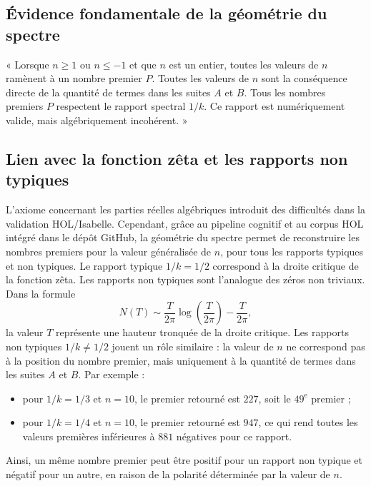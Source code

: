 \documentclass[11pt,a4paper]{article}
\begin{document}
\subsection*{Évidence fondamentale de la géométrie du spectre}

\begin{boitenote}
« Lorsque $n\geq 1$ ou $n\leq -1$ et que $n$ est un entier, toutes les valeurs de $n$
ramènent à un nombre premier $P$. Toutes les valeurs de $n$ sont la conséquence
directe de la quantité de termes dans les suites $A$ et $B$. Tous les nombres
premiers $P$ respectent le rapport spectral $1/k$. Ce rapport est numériquement
valide, mais algébriquement incohérent. »
\end{boitenote}

\subsection*{Lien avec la fonction zêta et les rapports non typiques}

L'axiome concernant les parties réelles algébriques introduit des difficultés dans
la validation HOL/Isabelle. Cependant, grâce au pipeline cognitif et au corpus HOL
intégré dans le dépôt GitHub, la géométrie du spectre permet de reconstruire les
nombres premiers pour la valeur généralisée de $n$, pour tous les rapports typiques
et non typiques. Le rapport typique $1/k=1/2$ correspond à la droite critique de la
fonction zêta. Les rapports non typiques sont l'analogue des zéros non triviaux.
Dans la formule
\[
N(T)\sim\frac{T}{2\pi}\log\!\left(\frac{T}{2\pi}\right)-\frac{T}{2\pi},
\]
la valeur $T$ représente une hauteur tronquée de la droite critique. Les rapports non
typiques $1/k\neq 1/2$ jouent un rôle similaire : la valeur de $n$ ne correspond pas
à la position du nombre premier, mais uniquement à la quantité de termes dans les
suites $A$ et $B$. Par exemple :
\begin{itemize}[nosep]
  \item pour $1/k=1/3$ et $n=10$, le premier retourné est $227$, soit le
  $49^{\text{e}}$ premier ;
  \item pour $1/k=1/4$ et $n=10$, le premier retourné est $947$, ce qui rend toutes
  les valeurs premières inférieures à $881$ négatives pour ce rapport.
\end{itemize}
Ainsi, un même nombre premier peut être positif pour un rapport non typique et
négatif pour un autre, en raison de la polarité déterminée par la valeur de $n$.
\end{document}
